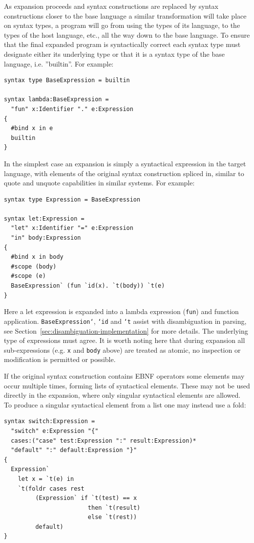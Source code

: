 \documentclass{kththesis}
\begin{document}
As expansion proceeds and syntax constructions are replaced by syntax constructions closer to the base language a similar transformation will take place on syntax types, a program will go from using the types of its language, to the types of the host language, etc., all the way down to the base language. To ensure that the final expanded program is syntactically correct each syntax type must designate either its underlying type or that it is a syntax type of the base language, i.e. ''builtin''. For example:

\begin{verbatim}
syntax type BaseExpression = builtin

syntax lambda:BaseExpression =
  "fun" x:Identifier "." e:Expression
{
  #bind x in e
  builtin
}
\end{verbatim}

In the simplest case an expansion is simply a syntactical expression in the target language, with elements of the original syntax construction spliced in, similar to quote and unquote capabilities in similar systems. For example:

\begin{verbatim}
syntax type Expression = BaseExpression

syntax let:Expression =
  "let" x:Identifier "=" e:Expression
  "in" body:Expression
{
  #bind x in body
  #scope (body)
  #scope (e)
  BaseExpression` (fun `id(x). `t(body)) `t(e)
}
\end{verbatim}

Here a let expression is expanded into a lambda expression (\texttt{fun}) and function application. \texttt{BaseExpression`}, \texttt{`id} and \texttt{`t} assist with disambiguation in parsing, see Section~\ref{sec:disambiguation-implementation} for more details. The underlying type of expressions must agree. It is worth noting here that during expansion all sub-expressions (e.g. \texttt{x} and \texttt{body} above) are treated as atomic, no inspection or modification is permitted or possible.

If the original syntax construction contains EBNF operators some elements may occur multiple times, forming lists of syntactical elements. These may not be used directly in the expansion, where only singular syntactical elements are allowed. To produce a singular syntactical element from a list one may instead use a fold:

\begin{verbatim}
syntax switch:Expression =
  "switch" e:Expression "{"
  cases:("case" test:Expression ":" result:Expression)*
  "default" ":" default:Expression "}"
{
  Expression`
    let x = `t(e) in
    `t(foldr cases rest
         (Expression` if `t(test) == x
                        then `t(result)
                        else `t(rest))
         default)
}
\end{verbatim}
\end{document}
